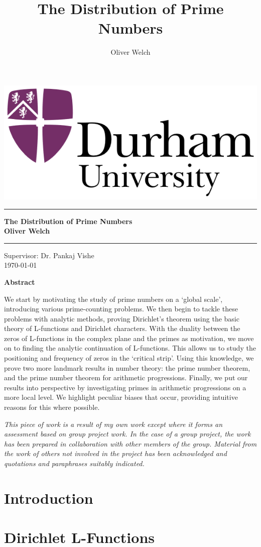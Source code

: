 \documentclass[11pt]{report} %
\title{The Distribution of Prime Numbers}
\author{Oliver Welch}
\numberwithin{equation}{chapter}
\theoremstyle{definition}
\theoremstyle{remark}
\newlength{\drop}
\newcommand*{\plogo}{\includegraphics[width=0.5\linewidth]{University_of_Durham_logo.png}}
\newcommand*{\titleUL}{\begingroup%
\drop=0.2\textheight
\begin{center}
{\LARGE \plogo}\\[\drop]
\rule{\textwidth}{2pt}\par
\vspace{0.5\baselineskip}
{\huge\bfseries The Distribution of Prime Numbers\\[1.5\baselineskip]
\huge Oliver Welch}\\[0.5\baselineskip]
\rule{\textwidth}{2pt}\par
\vspace{3\baselineskip}
{\LARGE Supervisor: Dr. Pankaj Vishe}\\[1.5\baselineskip]
{\LARGE \today}
\end{center}
\endgroup}
\begin{document}
\begin{titlepage}
\titleUL
\end{titlepage}

\clearpage
\hspace{0pt}
\vfill
\begin{center}
    {\Large \textbf{Abstract}} \\ \vspace{1em}
\end{center}

We start by motivating the study of prime numbers on a `global scale', introducing various prime-counting problems. We then begin to tackle these problems with analytic methods, proving Dirichlet's theorem using the basic theory of L-functions and Dirichlet characters. With the duality between the zeros of L-functions in the complex plane and the primes as motivation, we move on to finding the analytic continuation of L-functions. This allows us to study the positioning and frequency of zeros in the `critical strip'. Using this knowledge, we prove two more landmark results in number theory: the prime number theorem, and the prime number theorem for arithmetic progressions. Finally, we put our results into perspective by investigating primes in arithmetic progressions on a more local level. We highlight peculiar biases that occur, providing intuitive reasons for this where possible. 

\vspace{1cm}

{\small\textit{This piece of work is a result of my own work except where it forms an assessment based on group project work. In the case of a group project, the work has been prepared in collaboration with other members of the group. Material from the work of others not involved in the project has been acknowledged and quotations and paraphrases suitably indicated.}}
\vfill
\hspace{0pt}

\tableofcontents
{}



\chapter{Introduction}


\chapter{Dirichlet L-Functions}




\end{document}
